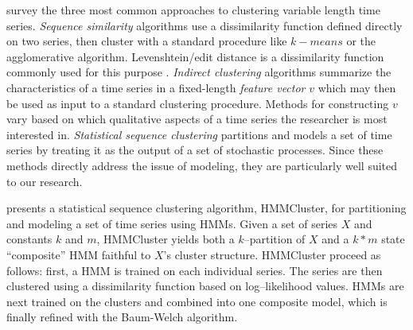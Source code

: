 \citet{xuwunsch} survey the three most common approaches to clustering variable length time series. \textit{Sequence similarity} algorithms use a dissimilarity function defined directly on two series, then cluster with a standard procedure like $k-means$ or the agglomerative algorithm. Levenshtein/edit distance is a dissimilarity function commonly used for this purpose \citep{sankoff99}. \textit{Indirect clustering} algorithms summarize the characteristics of a time series in a fixed-length \textit{feature vector} $v$ which may then be used as input to a standard clustering procedure. Methods for constructing $v$ vary based on which qualitative aspects of a time series the researcher is most interested in. \textit{Statistical sequence clustering} partitions and models a set of time series by treating it as the output of a set of stochastic processes. Since these methods directly address the issue of modeling, they are particularly well suited to our research.

\citet{smyth} presents a statistical sequence clustering algorithm, HMMCluster, for partitioning and modeling a set of time series using HMMs. Given a set of series $X$ and constants $k$ and $m$, HMMCluster yields both a $k$--partition of $X$ and a $k*m$ state ``composite'' HMM faithful to $X$'s cluster structure. HMMCluster proceed as follows: first, a HMM is trained on each individual series. The series are then clustered using a dissimilarity function based on log--likelihood values. HMMs are next trained on the clusters and combined into one composite model, which is finally refined with the Baum-Welch algorithm.

